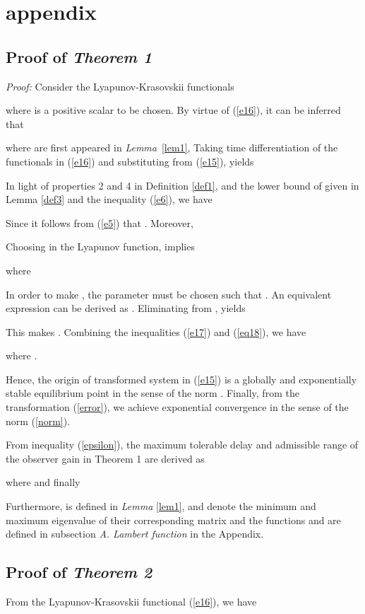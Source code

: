 \documentclass[12pt,draftcls,onecolumn]{IEEEtran}
\newcommand{\carre} {\hfill }
\begin{document}
\section{appendix}

\subsection{Proof of {\it Theorem 1}}

{\it Proof:}
Consider the Lyapunov-Krasovskii functionals

where  is a positive scalar to be chosen. By virtue of (\ref{e16}), it can be inferred that

where  are first appeared in \textit{Lemma}~\ref{lem1}, Taking time differentiation of the functionals in (\ref{e16}) and substituting from (\ref{e15}), yields

 In light of properties 2 and 4 in  Definition \ref{def1}, and the lower bound of  given in Lemma \ref{def3} and the inequality (\ref{e6}), we have

Since  it follows from (\ref{e5}) that . Moreover,

Choosing   in the Lyapunov function, implies


where


In order to make , the parameter  must be chosen such that . An equivalent expression can be derived as . Eliminating  from , yields

This makes .
Combining the inequalities (\ref{e17}) and (\ref{eq18}), we have

where .

Hence, the origin of transformed system  in (\ref{e15}) is a globally and exponentially stable equilibrium point in the sense of the norm . Finally, from the transformation (\ref{error}), we achieve exponential convergence in the sense of the norm (\ref{norm}).

From inequality (\ref{epsilon}), the maximum tolerable delay and admissible range of the observer gain in Theorem 1 are derived as

where  
and finally

Furthermore,   is defined in {\it{Lemma}} \ref{lem1},  and  denote the minimum and maximum eigenvalue of their corresponding matrix and the functions  and  are defined in subsection \textit{A. Lambert function} in the Appendix. \carre

\subsection{Proof of {\it Theorem 2}}
 From the Lyapunov-Krasovskii functional (\ref{e16}), we have
\end{document}
